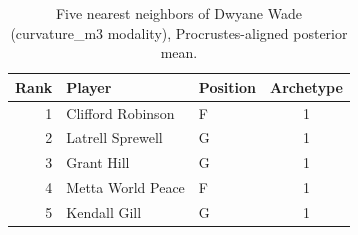 \begin{table}[htbp]
  \centering\small
  \begin{tabular}{rllc}
    \toprule
    Rank & Player & Position & Archetype \\
    \midrule
    1 & Clifford Robinson & F & 1 \\
    2 & Latrell Sprewell & G & 1 \\
    3 & Grant Hill & G & 1 \\
    4 & Metta World Peace & F & 1 \\
    5 & Kendall Gill & G & 1 \\
    \bottomrule
  \end{tabular}
  \caption{Five nearest neighbors of Dwyane Wade (curvature_m3 modality), Procrustes-aligned posterior mean.}
  \label{tab:Dwyane_Wade_neighbors_curvature_m3}
\end{table}

